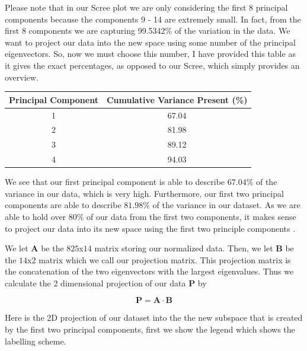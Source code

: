 \documentclass{article}
\begin{document}
Please note that in our Scree plot we are only considering the first 8 principal components because the components 9 - 14 are extremely small. In fact, from the first 8 components we are capturing 99.5342\% of the variation in the data. We want to project our data into the new space using some number of the principal eigenvectors. So, now we must choose this number, I have provided this table as it gives the exact percentages, as opposed to our Scree, which simply provides an overview.

\begin{center}
\begin{tabular}{ |c|c| } 
\hline
Principal Component & Cumulative Variance Present (\%) \\
\hline
1 & 67.04 \\ 
2 & 81.98 \\ 
3 & 89.12 \\ 
4 & 94.03 \\
\hline
\end{tabular}
\end{center}

We see that our first principal component is able to describe $67.04\%$ of the variance in our data, which is very high. Furthermore, our first two principal components are able to describe $81.98\%$ of the variance in our dataset. As we are able to hold over $80\%$ of our data from the first two components, it makes sense to project our data into its new space using the first two principle components .
\vspace{3mm}

We let $\bm{A}$ be the $825$x$14$ matrix storing our normalized data. Then, we let $\bm{B}$ be the $14$x$2$ matrix which we call our projection matrix. This projection matrix is the concatenation of the two eigenvectors with the largest eigenvalues. Thus we calculate the 2 dimensional projection of our data $\bm{P}$ by

$$
\bm{P} = \bm{A} \cdot \bm{B}
$$

Here is the 2D projection of our dataset into the the new subspace that is created by the first two principal components, first we show the legend which shows the labelling scheme.
\end{document}
